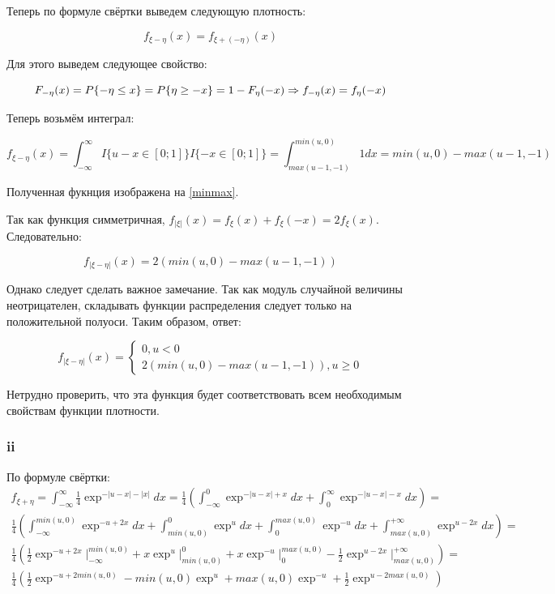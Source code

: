 \documentclass[a4paper,12pt]{article}
\begin{document}
 Теперь по формуле свёртки выведем следующую плотность:
 
 \[ f_{\xi - \eta}(x) = f_{\xi + (-\eta)}(x) \]
 
Для этого выведем следующее свойство:

 
\[  F_{-\eta}(x) = P\{-\eta \le x\} = P\{\eta \ge -x\} =\\ 1 -F_{\eta}(-x) \Rightarrow f_{-\eta}(x) = f_{\eta}(-x) \] 

Теперь возьмём интеграл:


\[  f_{\xi - \eta}(x) = \int_{-\infty}^{\infty} I\{u - x \in [0;1]\} I\{- x \in [0;1]\} = \int_{max(u-1,-1)}^{min(u,0)}1 dx = min(u,0) - max(u-1,-1) \]

Полученная фукнция изображена на \ref{minmax}.

Так как функция симметричная, $ f_{|\xi|}(x) = f_\xi(x) + f_\xi(-x) = 2 f_\xi(x) $. Следовательно: 

\[  f_{|\xi - \eta|}(x) = 2(min(u,0) - max(u-1,-1))  \]

Однако следует сделать важное замечание. Так как модуль случайной величины неотрицателен, складывать функции распределения следует только на положительной полуоси. Таким образом, ответ:

\[  f_{|\xi - \eta|}(x) = 
\begin{cases}
0, u < 0\\
2(min(u,0) - max(u-1,-1)), u \ge 0
\end{cases}
 \]
 
 Нетрудно проверить, что эта функция будет соответствовать всем необходимым свойствам функции плотности.


\subsubsection{ii}

По формуле свёртки:
\begin{equation*}
\begin{aligned}
f_{\xi + \eta} = \int_{-\infty}^{\infty} \frac{1}{4} \exp^{-|u-x|-|x|} dx=  \frac{1}{4}  \left( \int_{-\infty}^{0} \exp^{-|u-x|+x} dx + \int_{0}^{\infty}  \exp^{-|u-x|-x} dx \right) = \\ \frac{1}{4} \left( \int_{-\infty}^{min(u,0)} \exp^{-u+2x} dx+ \int_{min(u,0)}^{0} \exp^{u} dx+ \int_{0}^{max(u,0)}  \exp^{-u} dx + \int_{max(u,0)}^{+\infty}  \exp^{u-2x} dx \right) = \\
\frac{1}{4} \left( \frac{1}{2}\exp^{-u+2x} \Biggr|_{-\infty}^{min(u,0)}  + x \exp^u \Biggr|_{min(u,0)}^{0} + x \exp^{-u} \Biggr|_{0}^{max(u, 0)}  - \frac{1}{2} \exp^{u-2x} \Biggr|_{max(u, 0)}^{+\infty} \right) = \\
\frac{1}{4} \left( \frac{1}{2}\exp^{-u+2min(u,0)} - min(u,0) \exp^u + max(u,0) \exp^{-u} + \frac{1}{2} \exp^{u-2max(u, 0)} \right)
\end{aligned}
\end{equation*}
\end{document}
